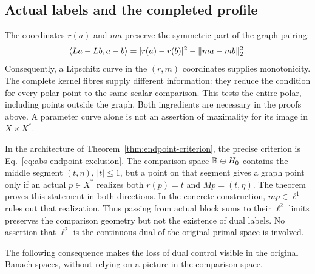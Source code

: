 \subsection{Actual labels and the completed profile}
The coordinates $r(a)$ and $ma$ preserve the symmetric part of the graph
pairing:
\[
\langle La-Lb,a-b\rangle=|r(a)-r(b)|^2-\|ma-mb\|_2^2.
\]
Consequently, a Lipschitz curve in the $(r,m)$ coordinates supplies
monotonicity. The complete kernel fibres supply different information:
they reduce the condition for every polar point to the same scalar
comparison. This tests the entire polar, including points outside the graph.
Both ingredients are necessary in the proofs above. A parameter curve
alone is not an assertion of maximality for its image in $X\times X^*$.

In the architecture of Theorem~\ref{thm:endpoint-criterion}, the precise
criterion is Eq.~\eqref{eq:abs-endpoint-exclusion}. The comparison space
$\mathbb R\oplus H_0$ contains the middle segment $(t,\eta)$, $|t|\le1$,
but a point on that segment gives a graph point only if an actual
$p\in X^*$ realizes both $r(p)=t$ and $Mp=(t,\eta)$. The theorem proves
this statement in both directions. In the concrete construction,
$mp\in\ell^1$ rules out that realization. Thus passing from actual
block sums to their $\ell^2$ limits preserves the comparison geometry
but not the existence of dual labels. No assertion that $\ell^2$ is
the continuous dual of the original primal space is involved.

The following consequence makes the loss of dual control visible in
the original Banach spaces, without relying on a picture in the
comparison space.

